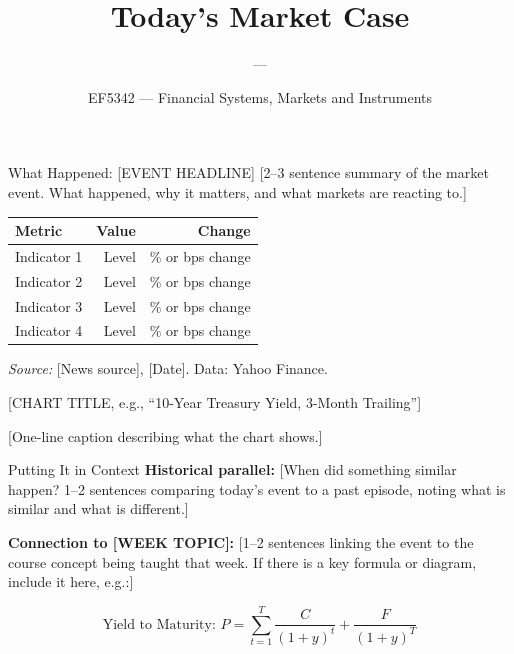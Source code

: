 \documentclass[aspectratio=169, 11pt]{beamer}
\title{Today's Market Case}
\subtitle{\casetopic{} --- \casedate}
\author{EF5342 --- Financial Systems, Markets and Instruments}
\institute{City University of Hong Kong}
\date{\casedate}
\begin{document}
\begin{frame}
\titlepage
\end{frame}

\begin{frame}{What Happened: [EVENT HEADLINE]}
[2--3 sentence summary of the market event. What happened, why it matters,
and what markets are reacting to.]

\vspace{1em}
\begin{table}
\centering
\small
\begin{tabular}{lrr}
\toprule
Metric & Value & Change \\
\midrule
Indicator 1 & Level & \% or bps change \\
Indicator 2 & Level & \% or bps change \\
Indicator 3 & Level & \% or bps change \\
Indicator 4 & Level & \% or bps change \\
\bottomrule
\end{tabular}
\end{table}

\vspace{0.5em}
{\footnotesize \textit{Source:} [News source], [Date]. Data: Yahoo Finance.}
\end{frame}

\begin{frame}{[CHART TITLE, e.g., ``10-Year Treasury Yield, 3-Month Trailing'']}
\begin{center}
\end{center}
\vspace{-0.5em}
{\footnotesize [One-line caption describing what the chart shows.]}
\end{frame}

\begin{frame}{Putting It in Context}
\textbf{Historical parallel:}
[When did something similar happen? 1--2 sentences comparing today's event to
a past episode, noting what is similar and what is different.]

\vspace{1em}
\textbf{Connection to [WEEK TOPIC]:}
[1--2 sentences linking the event to the course concept being taught that week.
If there is a key formula or diagram, include it here, e.g.:]

\[
\text{Yield to Maturity: } P = \sum_{t=1}^{T} \frac{C}{(1+y)^t} + \frac{F}{(1+y)^T}
\]
\end{frame}
\end{document}
